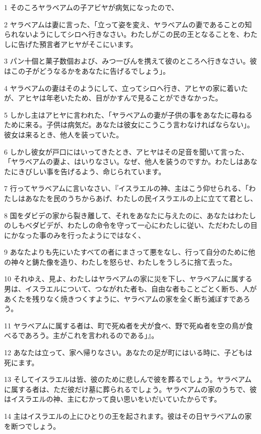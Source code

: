 \par 1 そのころヤラベアムの子アビヤが病気になったので、
\par 2 ヤラベアムは妻に言った、「立って姿を変え、ヤラベアムの妻であることの知られないようにしてシロへ行きなさい。わたしがこの民の王となることを、わたしに告げた預言者アヒヤがそこにいます。
\par 3 パン十個と菓子数個および、みつ一びんを携えて彼のところへ行きなさい。彼はこの子がどうなるかをあなたに告げるでしょう」。
\par 4 ヤラベアムの妻はそのようにして、立ってシロへ行き、アヒヤの家に着いたが、アヒヤは年老いたため、目がかすんで見ることができなかった。
\par 5 しかし主はアヒヤに言われた、「ヤラベアムの妻が子供の事をあなたに尋ねるために来る。子供は病気だ。あなたは彼女にこうこう言わなければならない」。彼女は来るとき、他人を装っていた。
\par 6 しかし彼女が戸口にはいってきたとき、アヒヤはその足音を聞いて言った、「ヤラベアムの妻よ、はいりなさい。なぜ、他人を装うのですか。わたしはあなたにきびしい事を告げるよう、命じられています。
\par 7 行ってヤラベアムに言いなさい、『イスラエルの神、主はこう仰せられる、「わたしはあなたを民のうちからあげ、わたしの民イスラエルの上に立てて君とし、
\par 8 国をダビデの家から裂き離して、それをあなたに与えたのに、あなたはわたしのしもべダビデが、わたしの命令を守って一心にわたしに従い、ただわたしの目にかなった事のみを行ったようにではなく、
\par 9 あなたよりも先にいたすべての者にまさって悪をなし、行って自分のために他の神々と鋳た像を造り、わたしを怒らせ、わたしをうしろに捨て去った。
\par 10 それゆえ、見よ、わたしはヤラベアムの家に災を下し、ヤラベアムに属する男は、イスラエルについて、つながれた者も、自由な者もことごとく断ち、人があくたを残りなく焼きつくすように、ヤラベアムの家を全く断ち滅ぼすであろう。
\par 11 ヤラベアムに属する者は、町で死ぬ者を犬が食べ、野で死ぬ者を空の鳥が食べるであろう。主がこれを言われるのである」』。
\par 12 あなたは立って、家へ帰りなさい。あなたの足が町にはいる時に、子どもは死にます。
\par 13 そしてイスラエルは皆、彼のために悲しんで彼を葬るでしょう。ヤラベアムに属する者は、ただ彼だけ墓に葬られるでしょう。ヤラベアムの家のうちで、彼はイスラエルの神、主にむかって良い思いをいだいていたからです。
\par 14 主はイスラエルの上にひとりの王を起されます。彼はその日ヤラベアムの家を断つでしょう。
